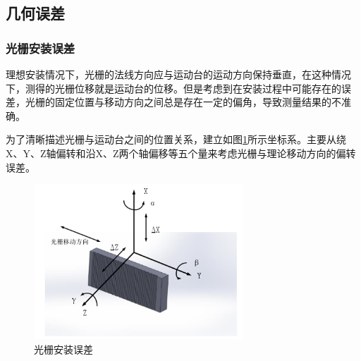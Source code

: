 \documentclass[type=master,oneside]{fduthesis}
\begin{document}
\subsection{几何误差}
\subsubsection{光栅安装误差}
理想安装情况下，光栅的法线方向应与运动台的运动方向保持垂直，在这种情况下，测得的光栅位移就是运动台的位移。但是考虑到在安装过程中可能存在的误差，光栅的固定位置与移动方向之间总是存在一定的偏角，导致测量结果的不准确。

为了清晰描述光栅与运动台之间的位置关系，建立如图\ref{fig:光栅安装误差}所示坐标系。主要从绕X、Y、Z轴偏转和沿X、Z两个轴偏移等五个量来考虑光栅与理论移动方向的偏转误差。
\begin{figure}[H]
  \centering
  \includegraphics[width=0.7\textwidth]{4-fig//光栅安装误差.png}
  \caption{光栅安装误差}
  \label{fig:光栅安装误差}
\end{figure}
\end{document}
